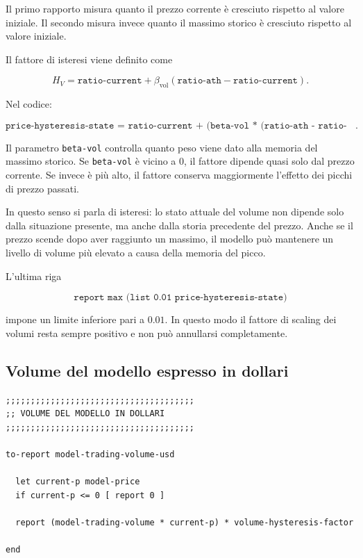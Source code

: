 Il primo rapporto misura quanto il prezzo corrente è cresciuto rispetto al
valore iniziale. Il secondo misura invece quanto il massimo storico è cresciuto
rispetto al valore iniziale.

Il fattore di isteresi viene definito come

\[
H_V
=
\texttt{ratio-current}
+
\beta_{\mathrm{vol}}
\left(
\texttt{ratio-ath}
-
\texttt{ratio-current}
\right).
\]

Nel codice:

\[
\texttt{price-hysteresis-state = ratio-current + (beta-vol * (ratio-ath - ratio-current))}.
\]

Il parametro \texttt{beta-vol} controlla quanto peso viene dato alla memoria del
massimo storico. Se \texttt{beta-vol} è vicino a \(0\), il fattore dipende quasi
solo dal prezzo corrente. Se invece è più alto, il fattore conserva maggiormente
l'effetto dei picchi di prezzo passati.

In questo senso si parla di isteresi: lo stato attuale del volume non dipende
solo dalla situazione presente, ma anche dalla storia precedente del prezzo.
Anche se il prezzo scende dopo aver raggiunto un massimo, il modello può
mantenere un livello di volume più elevato a causa della memoria del picco.

L'ultima riga

\[
\texttt{report max (list 0.01 price-hysteresis-state)}
\]

impone un limite inferiore pari a \(0.01\). In questo modo il fattore di scaling
dei volumi resta sempre positivo e non può annullarsi completamente.

\subsection{Volume del modello espresso in dollari}

\begin{lstlisting}[caption={Reporter per il volume di trading del modello in dollari}]
;;;;;;;;;;;;;;;;;;;;;;;;;;;;;;;;;;;;;;
;; VOLUME DEL MODELLO IN DOLLARI
;;;;;;;;;;;;;;;;;;;;;;;;;;;;;;;;;;;;;;

to-report model-trading-volume-usd

  let current-p model-price
  if current-p <= 0 [ report 0 ]

  report (model-trading-volume * current-p) * volume-hysteresis-factor

end
\end{lstlisting}

